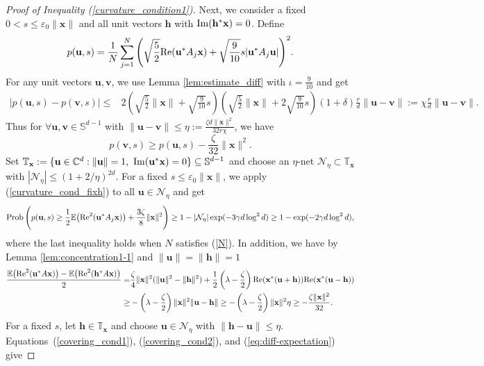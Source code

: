 \documentclass{article}
\renewcommand{\eqref}[1]{(\ref{#1})}
\newcommand{\C}{{\mathbb C}}
\newcommand{\E}{{\mathbb E}}
\newcommand{\bbS}{{\mathbb S}}
\newcommand{\calN}{{\mathcal N}}
\newcommand{\Prob}{{\rm Prob}}
\newcommand{\re}{{\rm Re}}
\newcommand{\im}{{\rm Im}}
\newcommand{\vx}{{\mathbf x}}
\newcommand{\vv}{{\mathbf v}}
\newcommand{\vu}{{\mathbf u}}
\newcommand{\vh}{{\mathbf h}}
\newcommand{\0}{{\mathbf 0}}
\numberwithin{equation}{section}
\begin{document}
\begin{proof}[Proof of Inequality \eqref{curvature_condition1}]
		\noindent
		Next, we consider a fixed $0< s\leq\varepsilon_0\|\vx\| $ and all unit vectors $\vh$ with $\im(\vh^*\vx)=0$. 
		Define $$p(\vu,s)=\frac{1}{N}\sum_{j=1}^{N}\Bigg( \sqrt{\frac{5}{2}}\re(\vu^*A_j\vx)+\sqrt{\frac{9}{10}}s|\vu^*A_j\vu|\Bigg)^2.$$ For any unit vectors $\vu,\vv$,  we use Lemma 
		\ref{lem:estimate_diff} with $\iota=\frac{9}{10}$ and get 
		\begin{align*}
			|p(\vu,s)-p(\vv,s)|
			\le& 2\left(\sqrt{\frac{5}{2}}\|\vx\|+\sqrt{\frac{9}{10}}s\right)\left( \sqrt{\frac{5}{2}}\|\vx\|+2\sqrt{\frac{9}{10}}s\right)(1+\delta)\frac{r}{d}\|\vu-\vv\|:=\chi\frac{r}{d}\|\vu-\vv\|.
		\end{align*}
		Thus for $\forall \vu,\vv\in\bbS^{d-1}$ with $ \|\vu-\vv\|\leq\eta:=\frac{\zeta d\|\vx\|^2}{32r\chi} $, we have
		\begin{equation}\label{covering_cond1}
			p(\vv,s)\ge p(\vu,s)-\frac{\zeta}{32}\|\vx\|^2.
		\end{equation}
		Set $\mathbb T_\vx:=\{\vu\in\C^d:\|\vu\|=1,\ \im(\vu^*\vx)=0\}\subseteq\bbS^{d-1}$ and choose an $\eta$-net $\calN_\eta\subset\mathbb T_\vx$ with $|\calN_\eta|\le(1+2/\eta)^{2d}$. %
	For a fixed $ s\leq\varepsilon_0\|\vx\| $, we apply \eqref{curvature_cond_fixh} to all $ \vu\in\calN_\eta $ and get 
	\begin{equation}\label{covering_cond2}
		\begin{split}
			\Prob\,\Bigg(p(\vu,s)\geq  \frac{1}{2}\E\big(\re^2(\vu^*A_j\vx)\big)+\frac{3\zeta}{8}\|\vx\|^2\Bigg)\ge 1-|\calN_\eta|\exp(-3\gamma d\log^2d)
			\geq 1-\exp(-2\gamma d\log^2d),
		\end{split}
	\end{equation}
	where the last inequality holds when $N$ satisfies \eqref{N}. In addition, we have by Lemma \ref{lem:concentration1-1} and $\|\vu\|=\|\vh\|=1$
	\begin{align}\label{eq:diff-expectation}
		\frac{\E\big(\re^2(\vu^*A\vx)\big)-\E\big(\re^2(\vh^*A\vx)\big)}{2}
		=&\frac{\zeta}{4}\|\vx\|^2(\|\vu\|^2-\|\vh\|^2)+\frac{1}{2}\left(\lambda-\frac{\zeta}{2}\right)\re(\vx^*(\vu+\vh))\re(\vx^*(\vu-\vh))\nonumber\\
		\ge&-\left(\lambda-\frac{\zeta}{2}\right)\|\vx\|^2\|\vu-\vh\|\ge-\left(\lambda-\frac{\zeta}{2}\right)\|\vx\|^2\eta\ge-\frac{\zeta\|\vx\|^2}{32}.
	\end{align}
	For a fixed $s$, let $\vh\in\mathbb T_\vx$ and choose $\vu\in\calN_\eta$ with $\|\vh-\vu\|\le\eta$.  Equations~\eqref{covering_cond1}, \eqref{covering_cond2}, and \eqref{eq:diff-expectation} give

\end{proof}
\end{document}
